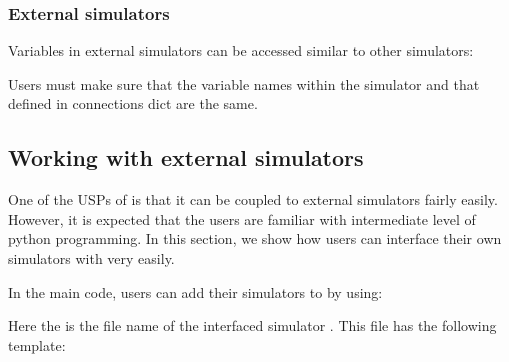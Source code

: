 \documentclass[letterpaper,10pt,english]{sphinxmanual}
\begin{document}
\subsubsection{External simulators}
\label{\detokenize{add_simulator:external-simulators}}
Variables in external simulators can be accessed similar to other simulators:

\begin{sphinxVerbatim}[commandchars=\\\{\}]
\end{sphinxVerbatim}

Users must make sure that the variable names within the simulator and that defined in  connections dict are the same.


\subsection{Working with external simulators}
\label{\detokenize{working_external_sims:working-with-external-simulators}}\label{\detokenize{working_external_sims::doc}}
One of the USPs of  is that it can be coupled to external simulators fairly easily. However, it is expected that the users are familiar with intermediate level of python programming. In this section, we show how users can interface their own simulators with  very easily.

In the main code, users can add their simulators to  by using:

\begin{sphinxVerbatim}[commandchars=\\\{\}]
       \PYG{p}{[} \PYG{p}{]} 
\end{sphinxVerbatim}

Here the  is the file name of the interfaced simulator . This file has the following template:
\end{document}
